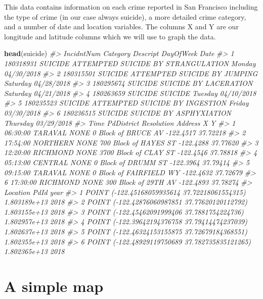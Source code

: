 \documentclass[
  12pt,
]{book}
\newenvironment{Shaded}{\begin{snugshade}}{\end{snugshade}}
\newcommand{\CommentTok}[1]{\textcolor[rgb]{0.37,0.37,0.37}{\textit{#1}}}
\newcommand{\KeywordTok}[1]{\textcolor[rgb]{0.27,0.27,0.27}{\textbf{#1}}}
\newcommand{\NormalTok}[1]{#1}
\begin{document}
This data contains information on each crime reported in San Francisco including the type of crime (in our case always suicide), a more detailed crime category, and a number of date and location variables. The columns X and Y are our longitude and latitude columns which we will use to graph the data.

\begin{Shaded}
\begin{Highlighting}[]
\KeywordTok{head}\NormalTok{(suicide)}
\CommentTok{\#>   IncidntNum Category                           Descript DayOfWeek       Date}
\CommentTok{\#> 1  180318931  SUICIDE ATTEMPTED SUICIDE BY STRANGULATION    Monday 04/30/2018}
\CommentTok{\#> 2  180315501  SUICIDE       ATTEMPTED SUICIDE BY JUMPING  Saturday 04/28/2018}
\CommentTok{\#> 3  180295674  SUICIDE              SUICIDE BY LACERATION  Saturday 04/21/2018}
\CommentTok{\#> 4  180263659  SUICIDE                            SUICIDE   Tuesday 04/10/2018}
\CommentTok{\#> 5  180235523  SUICIDE     ATTEMPTED SUICIDE BY INGESTION    Friday 03/30/2018}
\CommentTok{\#> 6  180236515  SUICIDE            SUICIDE BY ASPHYXIATION  Thursday 03/29/2018}
\CommentTok{\#>       Time PdDistrict Resolution                 Address         X        Y}
\CommentTok{\#> 1 06:30:00    TARAVAL       NONE     0 Block of BRUCE AV {-}122.4517 37.72218}
\CommentTok{\#> 2 17:54:00   NORTHERN       NONE   700 Block of HAYES ST {-}122.4288 37.77620}
\CommentTok{\#> 3 12:20:00   RICHMOND       NONE   3700 Block of CLAY ST {-}122.4546 37.78818}
\CommentTok{\#> 4 05:13:00    CENTRAL       NONE     0 Block of DRUMM ST {-}122.3964 37.79414}
\CommentTok{\#> 5 09:15:00    TARAVAL       NONE 0 Block of FAIRFIELD WY {-}122.4632 37.72679}
\CommentTok{\#> 6 17:30:00   RICHMOND       NONE    300 Block of 29TH AV {-}122.4893 37.78274}
\CommentTok{\#>                                         Location         PdId year}
\CommentTok{\#> 1  POINT ({-}122.45168059935614 37.72218061554315) 1.803189e+13 2018}
\CommentTok{\#> 2  POINT ({-}122.42876060987851 37.77620120112792) 1.803155e+13 2018}
\CommentTok{\#> 3   POINT ({-}122.45462091999406 37.7881754224736) 1.802957e+13 2018}
\CommentTok{\#> 4  POINT ({-}122.39642194376758 37.79414474237039) 1.802637e+13 2018}
\CommentTok{\#> 5  POINT ({-}122.46324153155875 37.72679184368551) 1.802355e+13 2018}
\CommentTok{\#> 6 POINT ({-}122.48929119750689 37.782735835121265) 1.802365e+13 2018}
\end{Highlighting}
\end{Shaded}

\hypertarget{a-simple-map}{%
\section{A simple map}\label{a-simple-map}}
\end{document}
